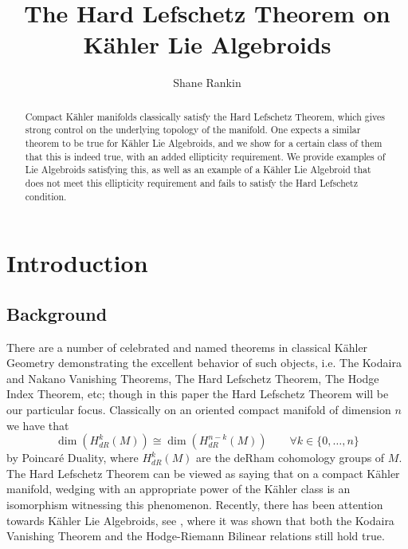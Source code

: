 \documentclass{amsart}
\title[The Hard Lefschetz Theorem on K\"ahler Lie Algebroids]{The Hard Lefschetz Theorem on K\"ahler Lie Algebroids}
\author{Shane Rankin}
\theoremstyle{definition}
\theoremstyle{definition}
\begin{document}
\begin{abstract}
    Compact Kähler manifolds classically satisfy the Hard Lefschetz Theorem, which gives strong control on the underlying topology of the manifold. One expects a similar theorem to be true for Kähler Lie Algebroids, and we show for a certain class of them that this is indeed true, with an added ellipticity requirement. We provide examples of Lie Algebroids satisfying this, as well as an example of a Kähler Lie Algebroid that does not meet this ellipticity requirement and fails to satisfy the Hard Lefschetz condition.
\end{abstract}
\maketitle


\tableofcontents
\section{Introduction}
\subsection{Background}
There are a number of celebrated and named theorems in classical Kähler Geometry demonstrating the excellent behavior of such objects, i.e. The Kodaira and Nakano Vanishing Theorems, The Hard Lefschetz Theorem, The Hodge Index Theorem, etc; though in this paper the Hard Lefschetz Theorem will be our particular focus. Classically on an oriented compact manifold of dimension $n$ we have that 
\begin{equation*}
    \dim(H_{dR}^{k}(M)) \cong \dim(H_{dR}^{n-k}(M)) \qquad \forall k \in \{0,\dots, n\}
\end{equation*} by Poincar\'e Duality, where $H_{dR}^k(M)$ are the deRham cohomology groups of $M$. The Hard Lefschetz Theorem can be viewed as saying that on a compact Kähler manifold, wedging with an appropriate power of the Kähler class is an isomorphism witnessing this phenomenon. Recently, there has been attention towards Kähler Lie Algebroids, see \cite{MR4722602}, where it was shown that both the Kodaira Vanishing Theorem and the Hodge-Riemann Bilinear relations still hold true. 
\end{document}
